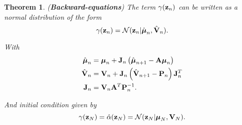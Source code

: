 \documentclass[11pt]{article}
\numberwithin{equation}{section}
\newcommand{\z}{{\bf z}}
\newcommand{\N}{\mathcal{N}}
\newtheorem{theorem}{Theorem}[section]
\begin{document}
\begin{theorem} (\textbf{Backward-equations}) \label{theorem:beta-backward-equations}
	The term $\gamma(\z_n)$ can be written as a normal distribution of the form
	\begin{equation}
		\gamma(\z_n) = \N(\z_n\vert \hat{\boldsymbol\mu}_n, \hat{\bf V}_n).
	\end{equation}
	
	With
	\begin{align}
		\hat{\boldsymbol{\mu}}_n &= \boldsymbol{\mu}_n + {\bf J}_n\left(\hat{\boldsymbol \mu}_{n+1} - {\bf A}\boldsymbol\mu_n\right)\\
		\hat{\bf V}_n &= {\bf V}_n + {\bf J}_n\left(\hat{\bf V}_{n+1} - {\bf P}_n\right){\bf J}_n^T\\
		{\bf J}_n &= {\bf V}_n{\bf A}^T{\bf P}_n^{-1}.
	\end{align}
	
	And initial condition given by
	\begin{equation}
		\gamma(\z_N) = \hat\alpha(\z_N) = \N(\z_N\vert \boldsymbol\mu_N, {\bf V}_N).
	\end{equation}
\end{theorem}
\end{document}
